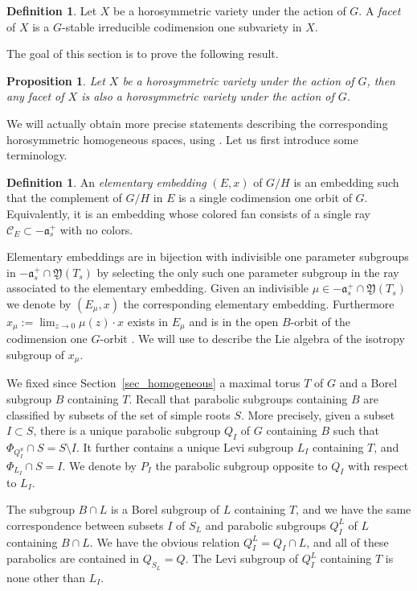 \documentclass{amsart}
\newtheorem{prop}[thm]{Proposition}
\theoremstyle{definition}
\newtheorem{defn}[thm]{Definition}
\begin{document}
\label{subsec_facets}

\begin{defn}
Let $X$ be a horosymmetric variety under the action of $G$. A 
\emph{facet} of $X$ is a $G$-stable irreducible codimension one subvariety in $X$.
\end{defn}
The goal of this section is to prove the following result.
\begin{prop}
\label{prop_facets}
Let $X$ be a horosymmetric variety under the action of $G$, then 
any facet of $X$ is also a horosymmetric 
variety under the action of $G$.
\end{prop}
We will actually obtain more precise statements describing the corresponding 
horosymmetric homogeneous spaces, using \cite{Bri90}. 
Let us first introduce some terminology. 

\begin{defn}
An \emph{elementary embedding} $(E,x)$ of $G/H$ is an embedding such 
that the complement of $G/H$ in $E$ is a single codimension one orbit 
of $G$. Equivalently, it is an embedding whose colored fan consists 
of a single ray $\mathcal{C}_E\subset -\mathfrak{a}_s^+$ with no colors. 
\end{defn}

Elementary embeddings are in bijection with indivisible one parameter subgroups 
in $-\mathfrak{a}_s^+\cap \mathfrak{Y}(T_s)$ by selecting the only such one parameter subgroup 
in the ray associated to the elementary embedding. Given an indivisible 
$\mu\in -\mathfrak{a}_s^+\cap \mathfrak{Y}(T_s)$ we denote by $(E_{\mu},x)$ the corresponding elementary 
embedding.
Furthermore 
$x_{\mu}:=\lim_{z\rightarrow 0} \mu(z)\cdot x$ exists in $E_{\mu}$ and is in 
the open $B$-orbit of the codimension one $G$-orbit \cite[Section~2.10]{BP87}. 
We will use \cite{Bri90} to describe the Lie algebra of the isotropy subgroup 
of $x_{\mu}$. 

We fixed since Section~\ref{sec_homogeneous}
a maximal torus $T$ of $G$ and a Borel subgroup $B$ containing $T$. 
Recall that parabolic subgroups containing $B$ are classified by subsets 
of the set of simple roots $S$. More precisely, given a subset $I\subset S$, 
there is a unique parabolic subgroup $Q_I$ of $G$ containing $B$ such that 
$\Phi_{Q_I^u}\cap S=S\setminus I$. It further contains a unique Levi subgroup $L_I$
containing $T$, and $\Phi_{L_I}\cap S=I$. We denote by $P_I$ the 
parabolic subgroup opposite to $Q_I$ with respect to $L_I$.

The subgroup $B\cap L$ is a Borel subgroup of $L$ containing $T$, and we have 
the same correspondence between subsets $I$ of $S_L$ and parabolic 
subgroups $Q_I^L$ of $L$ containing $B\cap L$. We have the obvious 
relation $Q_I^L=Q_I\cap L$, and all of these parabolics are contained 
in $Q_{S_L}=Q$. The Levi subgroup of $Q^L_I$ containing $T$ is none 
other than $L_I$. 
\end{document}
